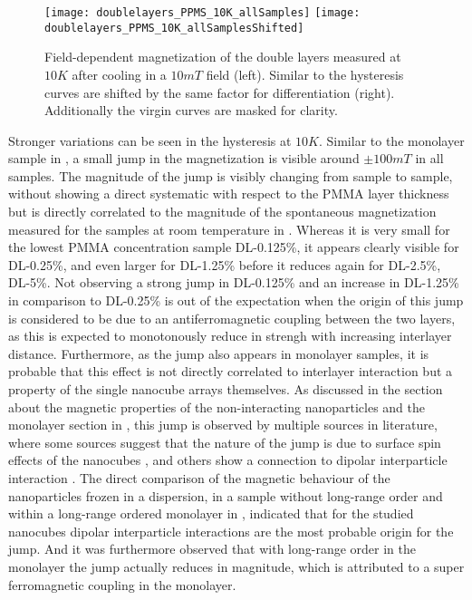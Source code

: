 \documentclass[\main/dresen_thesis.tex]{subfiles}
\begin{document}

    \begin{figure}[tb]
      \centering
      \texttt{[image: doublelayers\_PPMS\_10K\_allSamples]}
      \texttt{[image: doublelayers\_PPMS\_10K\_allSamplesShifted]}
      \caption{\label{fig:doubleLayers:10KVSM}Field-dependent magnetization of the double layers measured at $10 \unit{K}$ after cooling in a $10 \unit{mT}$ field (left). Similar to  the hysteresis curves are shifted by the same factor for differentiation (right). Additionally the virgin curves are masked for clarity.}
    \end{figure}
    Stronger variations can be seen in the hysteresis at $10 \unit{K}$.
    Similar to the monolayer sample in , a small jump in the magnetization is visible around $\pm 100 \unit{mT}$ in all samples.
    The magnitude of the jump is visibly changing from sample to sample, without showing a direct systematic with respect to the PMMA layer thickness but is directly correlated to the magnitude of the spontaneous magnetization measured for the samples at room temperature in .
    Whereas it is very small for the lowest PMMA concentration sample DL-0.125\%, it appears clearly visible for DL-0.25\%, and even larger for DL-1.25\% before it reduces again for DL-2.5\%, DL-5\%.
    Not observing a strong jump in DL-0.125\% and an increase in DL-1.25\% in comparison to DL-0.25\% is out of the expectation when the origin of this jump is considered to be due to an antiferromagnetic coupling between the two layers, as this is expected to monotonously reduce in strengh with increasing interlayer distance.
    Furthermore, as the jump also appears in monolayer samples, it is probable that this effect is not directly correlated to interlayer interaction but a property of the single nanocube arrays themselves.
    As discussed in the section about the magnetic properties of the non-interacting nanoparticles  and the monolayer section in , this jump is observed by multiple sources in literature, where some sources suggest that the nature of the jump is due to surface spin effects of the nanocubes \cite{Xu_2015_Simul, Fu_2012_Uniqu}, and others show a connection to dipolar interparticle interaction \cite{Alves_2017_Waspw, Sathya_2016_Cofeo}.
    The direct comparison of the magnetic behaviour of the nanoparticles frozen in a dispersion, in a sample without long-range order and within a long-range ordered monolayer in , indicated that for the studied nanocubes dipolar interparticle interactions are the most probable origin for the jump.
    And it was furthermore observed that with long-range order in the monolayer the jump actually reduces in magnitude, which is attributed to a super ferromagnetic coupling in the monolayer.
\end{document}
